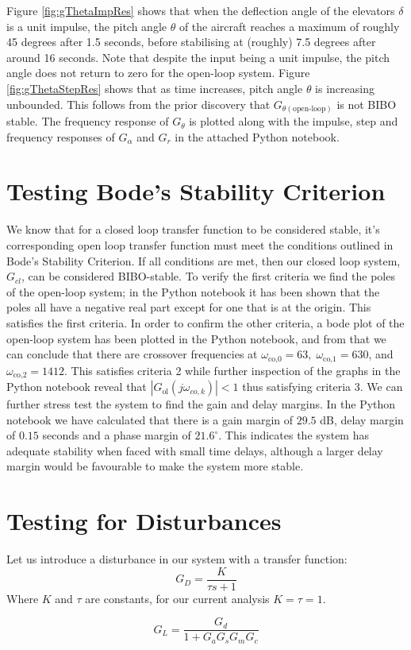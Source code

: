 \documentclass[10pt,a4paper]{article}
\begin{document}
    Figure \ref{fig:gThetaImpRes} shows that when the deflection angle of the elevators $\delta$ is a unit impulse, the pitch angle $\theta$ of the aircraft reaches a maximum of roughly 45 degrees after 1.5 seconds, before stabilising at (roughly) 7.5 degrees after around 16 seconds. Note that despite the input being a unit impulse, the pitch angle does not return to zero for the open-loop system.    Figure \ref{fig:gThetaStepRes} shows that as time increases, pitch angle $\theta$ is increasing unbounded. This follows from the prior discovery that $G_{\theta(\text{open-loop})}$ is not BIBO stable. The frequency response of $G_\theta$ is plotted along with the impulse, step and frequency responses of $G_\alpha$ and $G_r$ in the attached Python notebook.
    \section{Testing Bode's Stability Criterion}
    We know that for a closed loop transfer function to be considered stable, it's corresponding open loop transfer function must meet the conditions outlined in Bode's Stability Criterion. If all conditions are met, then our closed loop system, $G_{cl}$, can be considered BIBO-stable. To verify the first criteria we find the poles of the open-loop system; in the Python notebook it has been shown that the poles all have a negative real part except for one that is at the origin. This satisfies the first criteria. In order to confirm the other criteria, a bode plot of the open-loop system has been plotted in the Python notebook, and from that we can conclude that there are crossover frequencies at $\omega_{\text{co,0}}=63, \; \omega_{\text{co,1}} = 630$, and $\omega_{\text{co,2}} = 1412$. This satisfies criteria 2 while further inspection of the graphs in the Python notebook reveal that $|G_{\text{ol}}(j\omega_{co,k})| < 1$ thus satisfying criteria 3. We can further stress test the system to find the gain and delay margins. In the Python notebook we have calculated that there is a gain margin of $29.5$ dB, delay margin of $0.15$ seconds and a phase margin of $21.6^\circ$. This indicates the system has adequate stability when faced with small time delays, although a larger delay margin would be favourable to make the system more stable.
    

    \section{Testing for Disturbances}
    Let us introduce a disturbance in our system with a transfer function:
    \begin{equation}
        G_D = \frac{K}{\tau s + 1}
    \end{equation}
    Where $K$ and $\tau$ are constants, for our current analysis $K = \tau =1$.

    \begin{equation}
        G_{L} = \frac{G_d}{1 + G_aG_sG_mG_c}
    \end{equation}

\end{document}

